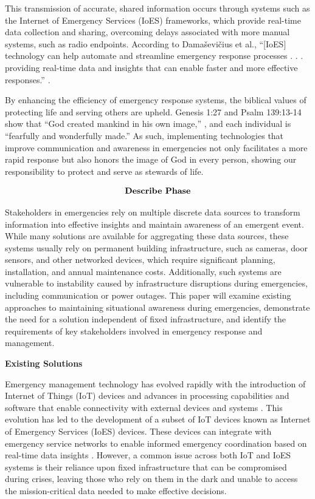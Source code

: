 \documentclass[english,12pt,a4paper,titlepage]{article}
\begin{document}
	This transmission of accurate, shared information occurs through systems such as the Internet of Emergency Services (IoES) frameworks, which provide real-time data collection and sharing, overcoming delays associated with more manual systems, such as radio endpoints. According to Damaševičius et al., “[IoES] technology can help automate and streamline emergency response processes . . .  providing real-time data and insights that can enable faster and more effective responses.” \autocite{Damasevicius2023}.
	
	By enhancing the efficiency of emergency response systems, the biblical values of protecting life and serving others are upheld. Genesis 1:27 and Psalm 139:13-14 show that “God created mankind in his own image,” \autocite{Genesis}, and each individual is “fearfully and wonderfully made.” \autocite{Psalm} As such, implementing technologies that improve communication and awareness in emergencies not only facilitates a more rapid response but also honors the image of God in every person, showing our responsibility to protect and serve as stewards of life.
	

	\[
	\begin{array}{cc}
		\mbox{\bfseries{Describe Phase}}
		\label{Describe Phase}
	\end{array}
	\]
	
	Stakeholders in emergencies rely on multiple discrete data sources to transform information into effective insights and maintain awareness of an emergent event. While many solutions are available for aggregating these data sources, these systems usually rely on permanent building infrastructure, such as cameras, door sensors, and other networked devices, which require significant planning, installation, and annual maintenance costs. Additionally, such systems are vulnerable to instability caused by infrastructure disruptions during emergencies, including communication or power outages. This paper will examine existing approaches to maintaining situational awareness during emergencies, demonstrate the need for a solution independent of fixed infrastructure, and identify the requirements of key stakeholders involved in emergency response and management.
	
	\label{Describe Phase - Prior Solutions}
	\begin{flushleft}
		\bfseries{Existing Solutions}
	\end{flushleft}
	
	Emergency management technology has evolved rapidly with the introduction of Internet of Things (IoT) devices and advances in processing capabilities and software that enable connectivity with external devices and systems \autocite{Damasevicius2023}. This evolution has led to the development of a subset of IoT devices known as Internet of Emergency Services (IoES) devices. These devices can integrate with emergency service networks to enable informed emergency coordination based on real-time data insights \autocite{Damasevicius2023}. However, a common issue across both IoT and IoES systems is their reliance upon fixed infrastructure that can be compromised during crises, leaving those who rely on them in the dark and unable to access the mission-critical data needed to make effective decisions. 
	
\end{document}
